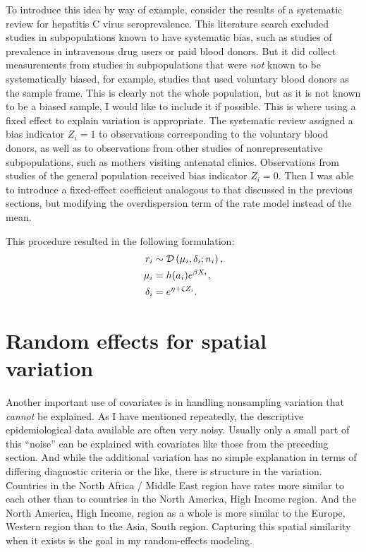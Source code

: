 To introduce this idea by way of example, consider the results of a
systematic review for hepatitis C virus seroprevalence.  This
literature search excluded studies in subpopulations known to have
systematic bias, such as studies of prevalence in intravenous drug
users or paid blood donors.  But it did collect measurements from
studies in subpopulations that were \emph{not} known to be
systematically biased, for example, studies that used voluntary blood
donors as the sample frame.  This is clearly not the whole population,
but as it is not known to be a biased sample, I would like to include
it if possible.  This is where using a fixed effect to explain
variation is appropriate. The systematic review assigned
a bias indicator $Z_i = 1$ to observations corresponding to
the voluntary blood donors, as well as to observations from other studies of nonrepresentative
subpopulations, such as mothers visiting antenatal clinics.
Observations from studies of the general
population received bias indicator $Z_i = 0$.  Then I was able to
introduce a fixed-effect coefficient analogous to that discussed in the previous sections,
but modifying the overdispersion term of the rate model instead of
the mean.

This procedure resulted in the following
formulation:
\begin{align*}
r_i &\sim \mathcal{D}\left(\mu_i, \delta_i; n_i\right),\\
\mu_i &= h(a_i)e^{\beta X_i},\\
\delta_i &= e^{\eta + \zeta Z_i}.
\end{align*}

\section{Random effects for spatial variation}
Another important use of covariates is in handling nonsampling
variation that \emph{cannot} be explained. As I have mentioned
repeatedly, the descriptive epidemiological data available are often
very noisy.  Usually only a small part of this ``noise''
can be explained with covariates like those from the preceding
section. And while the additional variation has no simple explanation
in terms of differing diagnostic criteria or the like, there is
structure in the variation. Countries in the North Africa / Middle East
region have rates more similar to each other than to countries in the
North America, High Income region.  And the North America, High Income,
region as a whole is more similar to the Europe, Western region than
to the Asia, South region.  Capturing this spatial similarity when it
exists is the goal in my random-effects modeling.

